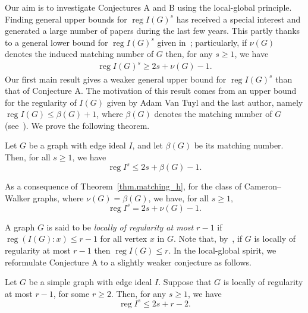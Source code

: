 \documentclass[ALCO,ThmDefs,Unicode,epreuves]{cedram}
\DeclareMathOperator{\reg}{reg}
\newcommand*{\reg}{\mathrm{reg}}
\begin{document}
Our aim is to investigate Conjectures A and B using the local-global principle. Finding general upper bounds for $\reg I(G)^s$ has received a special interest and generated a large number of papers during the last few years. This partly thanks to a general lower bound for $\reg I(G)^s$ given in~\cite{BHT}; particularly, if $\nu(G)$ denotes the induced matching number of $G$ then, for any $s \ge 1$, we have
\begin{align}
\reg I(G)^s \ge 2s + \nu(G)-1. \label{eq.genlowerbound}
\end{align}
Our first main result gives a weaker general upper bound for $\reg I(G)^s$ than that of Conjecture A. The motivation of this result comes from an upper bound for the regularity of $I(G)$ given by Adam Van Tuyl and the last author, namely $\reg I(G) \le \beta(G) + 1$, where $\beta(G)$ denotes the matching number of $G$ (see~\cite{HVT2008}). We prove the following theorem.

\begingroup
\setcounter{cdrthm}{3}
\def\thecdrthm{3.\arabic{cdrthm}}
\begin{theo}\label{thm.matching_h}
Let $G$ be a graph with edge ideal $I$, and let $\beta(G)$ be its matching number. Then, for all $s \ge 1$, we have
\[
\reg I^s \le 2s+\beta(G)-1.
\]

\end{theo}
\endgroup

As a consequence of Theorem~\ref{thm.matching_h}, for the class of Cameron--Walker graphs, where $\nu(G) = \beta(G)$, we have, for all $s\geq 1,$
\[
\reg I^s = 2s+\nu(G)-1.
\]


A graph $G$ is said to be \emph{locally of regularity at most $r-1$} if $\reg (I(G):x) \le r-1$ for all vertex $x$ in $G$. Note that, by~\cite[Proposition 4.9]{CHHKTT}, if $G$ is locally of regularity at most $r-1$ then $\reg I(G) \le r$. In the local-global spirit, we reformulate Conjecture A to a slightly weaker conjecture as follows.


\begingroup
\setcounter{cdrthm}{0}
\def\thecdrthm{\Alph{cdrthm}$'$}
\begin{conj}
Let $G$ be a simple graph with edge ideal $I$. Suppose that $G$ is locally of regularity at most $r-1$, for some $r \ge 2$. Then, for any $s \ge 1$, we have
\[
\reg I^s \le 2s+r-2.
\]

\end{conj}
\endgroup
\end{document}
